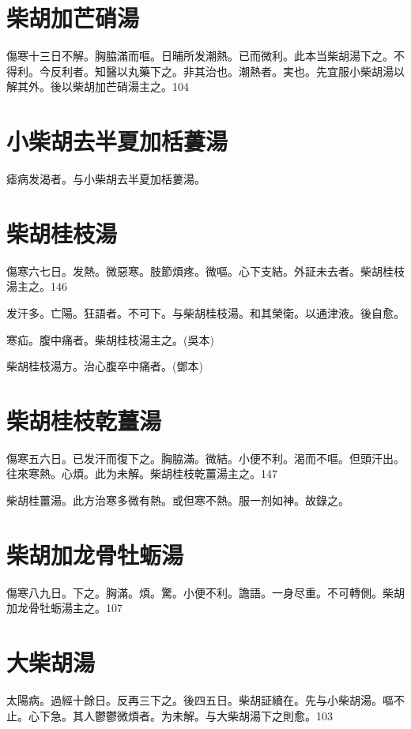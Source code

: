 \documentclass[b5paper,twoside,zihao=-4,UTF8]{ctexbook}
\begin{document}
\section{柴胡加芒硝湯}

傷寒十三日不解。胸脇滿而嘔。日晡所发潮熱{。已}而微利。此本当柴胡湯下之。不得利。今反利者。知醫以丸藥下之。非其治也。潮熱者。実也。先宜服小柴胡湯以解其外。後以柴胡加芒硝湯主之。104

\section{小柴胡去半夏加栝蔞湯}

瘧病发渴者。与小柴胡去半夏加栝蔞湯。

\section{柴胡桂枝湯}

傷寒六七日。发熱。微惡寒。肢節煩疼。微嘔。心下支結。外証未去者。柴胡桂枝湯主之。146

发汗多。亡陽。狂語者。不可下。与柴胡桂枝湯。和其榮衛。以通津液。後自愈。

寒疝。腹中痛者。柴胡桂枝湯主之。(吳本)

柴胡桂枝湯方。治心腹卒中痛者。(鄧本)

\section{柴胡桂枝乾薑湯}

傷寒五六日。已发汗而復下之。胸脇滿。微結。小便不利。渴而不嘔。但頭汗出。往來寒熱。心煩。此为未解。柴胡桂枝乾薑湯主之。147

柴胡桂薑湯。此方治寒多微有熱。或但寒不熱。服一剂如神。故錄之。

\section{柴胡加龙骨牡蛎湯}

傷寒八九日。下之。胸滿。煩。驚。小便不利。譫語。一身尽重。不可轉側。柴胡加龙骨牡蛎湯主之。107

\section{大柴胡湯}

太陽病。過經十餘日。反再三下之。後四五日。柴胡証續在。先与小柴胡湯。嘔不止。心下急。其人鬱鬱微煩者。为未解。与大柴胡湯下之則愈。103
\end{document}
